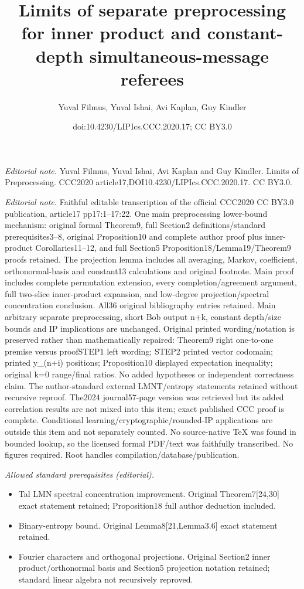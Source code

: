 \documentclass[10pt,a4paper]{article}
\title{Limits of separate preprocessing for inner product and constant-depth simultaneous-message referees}
\author{Yuval Filmus, Yuval Ishai, Avi Kaplan, Guy Kindler}
\date{doi:10.4230/LIPIcs.CCC.2020.17; CC BY3.0}
\begin{document}
\maketitle
\noindent\textit{Editorial note.} Yuval Filmus, Yuval Ishai, Avi Kaplan and Guy Kindler. Limits of Preprocessing. CCC2020 article17,DOI10.4230/LIPIcs.CCC.2020.17. CC BY3.0.\par\medskip
\noindent\textit{Editorial note.} Faithful editable transcription of the official CCC2020 CC BY3.0 publication, article17 pp17:1--17:22. One main preprocessing lower-bound mechanism: original formal Theorem9, full Section2 definitions/standard prerequisites3--8, original Proposition10 and complete author proof plus inner-product Corollaries11--12, and full Section5 Proposition18/Lemma19/Theorem9 proofs retained. The projection lemma includes all averaging, Markov, coefficient, orthonormal-basis and constant13 calculations and original footnote. Main proof includes complete permutation extension, every completion/agreement argument, full two-slice inner-product expansion, and low-degree projection/spectral concentration conclusion. All36 original bibliography entries retained. Main arbitrary separate preprocessing, short Bob output n+k, constant depth/size bounds and IP implications are unchanged. Original printed wording/notation is preserved rather than mathematically repaired: Theorem9 right one-to-one premise versus proofSTEP1 left wording; STEP2 printed vector codomain; printed y\_(n+i) positions; Proposition10 displayed expectation inequality; original k=0 range/final ratios. No added hypotheses or independent correctness claim. The author-standard external LMNT/entropy statements retained without recursive reproof. The2024 journal57-page version was retrieved but its added correlation results are not mixed into this item; exact published CCC proof is complete. Conditional learning/cryptographic/rounded-IP applications are outside this item and not separately counted. No source-native TeX was found in bounded lookup, so the licensed formal PDF/text was faithfully transcribed. No figures required. Root handles compilation/database/publication.\par\medskip
\noindent\textit{Allowed standard prerequisites (editorial).}\begin{itemize}
\item Tal LMN spectral concentration improvement. Original Theorem7[24,30] exact statement retained; Proposition18 full author deduction included.
\item Binary-entropy bound. Original Lemma8[21,Lemma3.6] exact statement retained.
\item Fourier characters and orthogonal projections. Original Section2 inner product/orthonormal basis and Section5 projection notation retained; standard linear algebra not recursively reproved.
\end{itemize}\medskip
\end{document}
